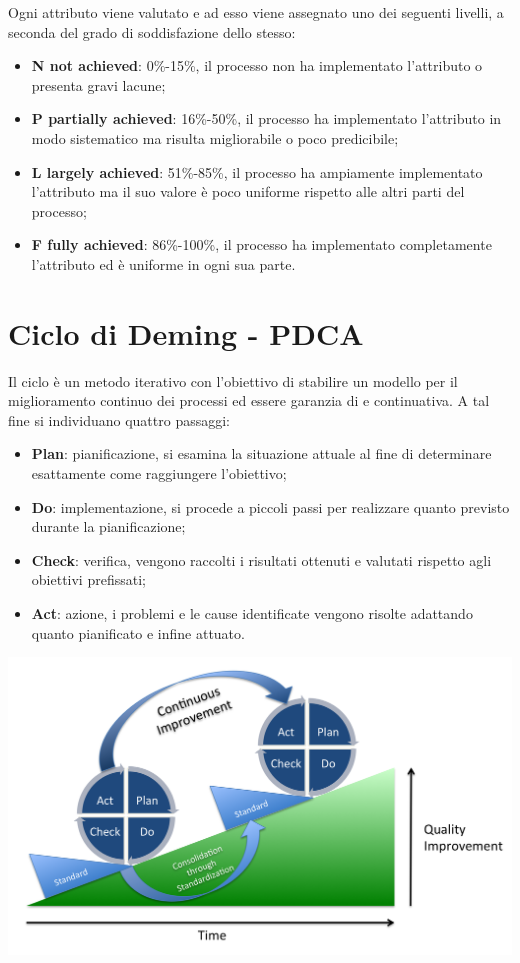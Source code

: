Ogni attributo viene valutato e ad esso viene assegnato uno dei seguenti livelli, a seconda del grado di soddisfazione dello stesso:
\begin{itemize}
	\item \textbf{N not achieved}: 0\%-15\%, il processo non ha implementato l'attributo o presenta gravi lacune;
	\item \textbf{P partially achieved}: 16\%-50\%, il processo ha implementato l'attributo in modo sistematico ma risulta migliorabile o poco predicibile;
	\item \textbf{L largely achieved}: 51\%-85\%, il processo ha ampiamente implementato l'attributo ma il suo valore è poco uniforme rispetto alle altri parti del processo;
	\item \textbf{F fully achieved}: 86\%-100\%, il processo ha implementato completamente l'attributo ed è uniforme in ogni sua parte.
\end{itemize}

\newpage

\section{Ciclo di Deming - PDCA} \label{PDCA}
Il ciclo  è un metodo iterativo con l'obiettivo di stabilire un modello per il miglioramento continuo dei processi ed essere garanzia di   e continuativa. 
A tal fine si individuano quattro passaggi:
\begin{itemize}
	\item\textbf{Plan}: pianificazione, si esamina la situazione attuale al fine di determinare esattamente come raggiungere l'obiettivo;
	\item\textbf{Do}: implementazione, si procede a piccoli passi per realizzare quanto previsto durante la pianificazione;
	\item\textbf{Check}: verifica, vengono raccolti i risultati ottenuti e valutati rispetto agli obiettivi prefissati;
	\item\textbf{Act}: azione, i problemi e le cause identificate vengono risolte adattando quanto pianificato e infine attuato.
\end{itemize}
\begin{center}
\includegraphics[scale=0.25]{Immagini/PDCA.png}
\end{center}

